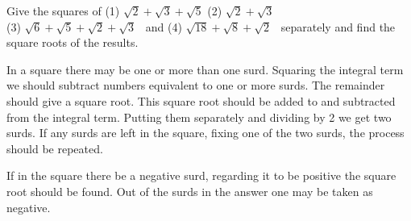 \documentclass[]{article}
\begin{document}
{\begin{quote}  {
}  \end{quote}

{Give the squares of \hfill (1) $\sqrt{2} + \sqrt{3} +\sqrt{5}$ \hfill (2) $\sqrt{2} + \sqrt{3}$\\
(3) $\sqrt{6} + \sqrt{5} + \sqrt{2} + \sqrt{3}$ ~and (4) $\sqrt{18} + \sqrt{8} +\sqrt{2}$ ~separately and find the square roots of the results.}

\begin{quote}  {
}  \end{quote}

{In a square there may be one or more than one surd. Squaring the
integral term we should subtract numbers equivalent to one or more
surds. The remainder should give a square root. This square root should
be added to and subtracted from the integral term. Putting them
separately and dividing by 2 we get two surds. If any surds are left in
the square, fixing one of the two surds, the process should be
repeated.}

\begin{quote}  {
}  \end{quote}

{If in the square there be a negative surd, regarding it to be positive
the square root should be found. Out of the surds in the answer one may
be taken as negative.\\
}
\newpage
\large

\begin{quote}  {}
\end{quote}}
\end{document}

